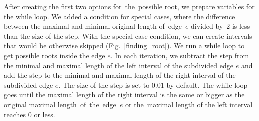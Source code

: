 After creating the first two options for~the~possible root, we prepare variables for the while loop. We added a condition for special cases, where the difference between the maximal and minimal original length of~edge~$e$ divided by~$2$ is less than the size of the step. With the special case condition, we can create intervals that would be otherwise skipped (Fig.~\ref{finding_root}). We run a while loop to get possible roots inside the edge $e$. In each iteration, we subtract the step from the minimal and maximal length of the left interval of the subdivided edge $e$ and add the step to the minimal and maximal length of the right interval of the subdivided edge $e$. The size of the step is set to $0.01$ by default. The while loop goes until the maximal length of the right interval is the same or bigger as the original maximal length~of~the~edge~$e$ or the~maximal length of the left interval reaches $0$ or less.

